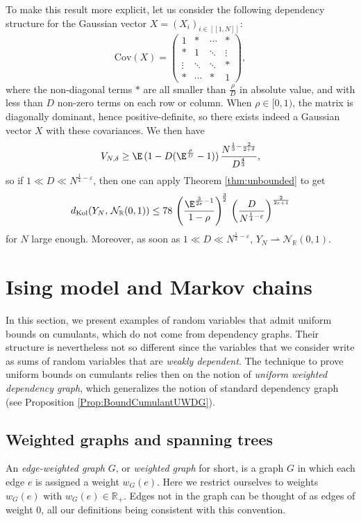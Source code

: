\documentclass[envcountsame]{svmult}
\def\WDep{G}
\newcommand{\R}{\mathbb{R}}
\newcommand{\dkol}{d_\mathrm{Kol}}
\newcommand{\eps}{\varepsilon}
\newcommand{\cov}{\mathrm{Cov}}
\newcommand{\gauss}{\mathcal{N}_{\R}(0,1)}
\newcommand{\lle}{\left[\!\left[}
\newcommand{\rre}{\right]\!\right]}
\begin{document}
\begin{example}
To make this result more explicit, let us consider the following dependency structure for the Gaussian vector $X = (X_i)_{i \in \lle 1,N\rre}$: 
$$\cov(X) = \begin{pmatrix}
1 & * & \cdots & * \\
* & 1 & \ddots & \vdots \\
\vdots & \ddots & \ddots & * \\
* & \cdots & * & 1
\end{pmatrix},$$
where the non-diagonal terms $*$ are all smaller than $\frac{\rho}{D}$ in absolute value, and with less than $D$ non-zero terms on each row or column. When $\rho \in [0,1)$, the matrix is diagonally dominant, hence positive-definite, so there exists indeed a Gaussian vector $X$ with these covariances. We then have
$$V_{N,\delta} \geq \E\,(1-D(\E^{\frac{\rho}{D}}-1))\,\frac{N^{\frac{1}{3}-\frac{2}{2+\delta}}}{D^{\frac{4}{3}}} ,$$
so if $1 \ll D \ll N^{\frac{1}{4}-\eps}$, then one can apply Theorem \ref{thm:unbounded} to get
 $$\dkol(Y_N,\,\gauss) \leq 78 \,\left(\frac{\E^{\frac{3}{2\eps}-1}}{1-\rho}\right)^{\!\frac{3}{2}}\,\left(\frac{D}{N^{\frac{1}{4}-\eps}}\right)^{\frac{2}{2\eps+1}}$$
for $N$ large enough. Moreover, as soon as $1 \ll D \ll N^{\frac{1}{2}-\eps}$, $Y_N \rightharpoonup \gauss$.
\end{example}


















\section{Ising model and Markov chains}\label{sec:markov}

In this section, we present examples of random variables that admit uniform bounds on cumulants,
which do not come from dependency graphs.
Their structure is nevertheless not so different
since the variables that we consider
write as sums of random variables that are {\em weakly dependent}.
The technique to prove uniform bounds on cumulants relies then on the notion of \emph{uniform weighted dependency graph}, which generalizes the notion of standard dependency graph
(see Proposition \ref{Prop:BoundCumulantUWDG}). 



\subsection{Weighted graphs and spanning trees}
An {\em edge-weighted graph} $\WDep$, or {\em weighted graph} for short, is a graph $\WDep$ in which
each edge $e$ is assigned a weight $w_G(e)$. Here we restrict ourselves to weights $w_G(e)$
with $w_G(e) \in \R_+$.
Edges not in the graph can be thought of as edges of weight $0$,
all our definitions being consistent with this convention.
\medskip
\end{document}
